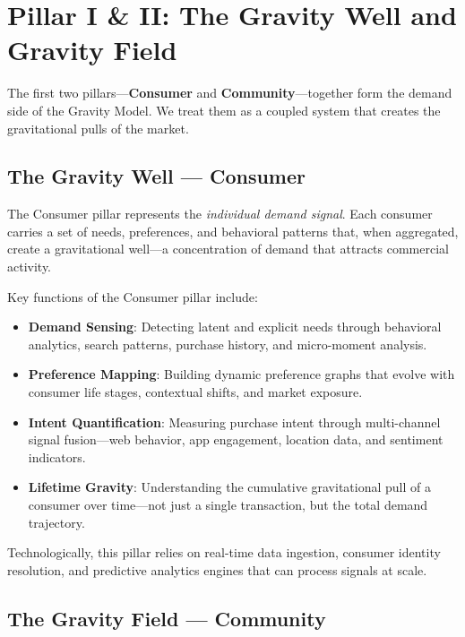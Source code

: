 \documentclass[11pt,a4paper,twocolumn]{article}
\begin{document}
\section{Pillar I \& II: The Gravity Well and Gravity Field}
\label{sec:gravity-pulls}

The first two pillars---\textbf{Consumer} and \textbf{Community}---together form the demand side of the Gravity Model. We treat them as a coupled system that creates the gravitational pulls of the market.

\subsection{The Gravity Well --- Consumer}

The Consumer pillar represents the \textit{individual demand signal}. Each consumer carries a set of needs, preferences, and behavioral patterns that, when aggregated, create a gravitational well---a concentration of demand that attracts commercial activity.

Key functions of the Consumer pillar include:

\begin{itemize}[leftmargin=1.5em]
  \item \textbf{Demand Sensing}: Detecting latent and explicit needs through behavioral analytics, search patterns, purchase history, and micro-moment analysis.
  \item \textbf{Preference Mapping}: Building dynamic preference graphs that evolve with consumer life stages, contextual shifts, and market exposure.
  \item \textbf{Intent Quantification}: Measuring purchase intent through multi-channel signal fusion---web behavior, app engagement, location data, and sentiment indicators.
  \item \textbf{Lifetime Gravity}: Understanding the cumulative gravitational pull of a consumer over time---not just a single transaction, but the total demand trajectory.
\end{itemize}

Technologically, this pillar relies on real-time data ingestion, consumer identity resolution, and predictive analytics engines that can process signals at scale.

\subsection{The Gravity Field --- Community}
\end{document}
